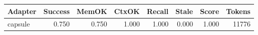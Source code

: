 \begin{tabular}{lrrrrrrr}
\hline
Adapter & Success & MemOK & CtxOK & Recall & Stale & Score & Tokens \\
\hline
capsule & 0.750 & 0.750 & 1.000 & 1.000 & 0.000 & 1.000 & 11776 \\
\hline
\end{tabular}
